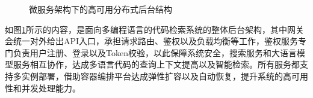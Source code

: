 \documentclass[UTF8,a4paper,12pt]{ctexart}
\numberwithin{equation}{section}
\begin{document}
\begin{figure}[H]
	\caption{微服务架构下的高可用分布式后台结构}
	\label{microservice_arch}
\end{figure}
如图\ref{microservice_arch}所示的内容，是面向多编程语言的代码检索系统的整体后台架构，其中网关会统一对外给出API入口，承担请求路由、鉴权以及负载均衡等工作，鉴权服务专门负责用户注册、登录以及Token校验，以此保障系统安全，搜索服务和大语言模型服务相互协作，达成多语言代码的查询上下文提高以及智能检索。所有服务都支持多实例部署，借助容器编排平台达成弹性扩容以及自动恢复，提升系统的高可用性和并发处理能力。\par
\end{document}
